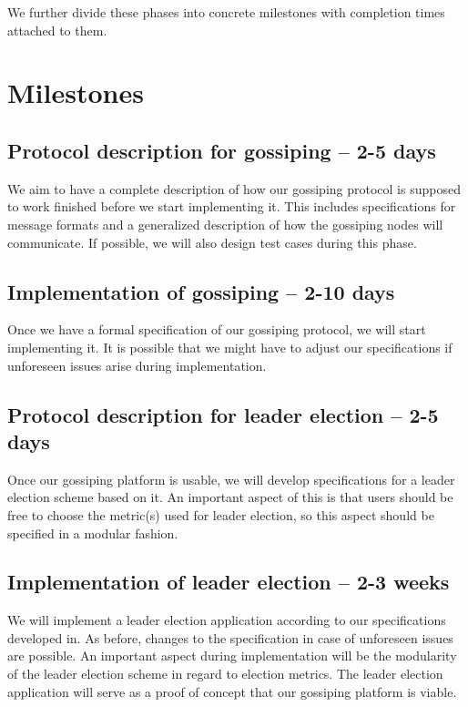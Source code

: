 \documentclass[11pt,
  a4paper,
  ngerman,
  BCOR=7mm
]{scrartcl}
\begin{document}
We further divide these phases into concrete milestones with completion
times attached to them.

\newpage

\section*{Milestones}
\label{sec:milestones}

\subsection*{Protocol description for gossiping -- 2-5 days}
\label{sub:protocol_gossiping}
 We aim to have a complete description of how our gossiping protocol is
 supposed to work finished before we start implementing it. This
 includes specifications for message formats and a generalized
 description of how the gossiping nodes will communicate. If possible,
 we will also design test cases during this phase.

\subsection*{Implementation of gossiping -- 2-10 days}
\label{sub:implementation_gossiping}
Once we have a formal specification of our gossiping protocol, we will
start implementing it. It is possible that we might have to adjust our
specifications if unforeseen issues arise during implementation.

\subsection*{Protocol description for leader election -- 2-5 days}
\label{sub:protocol_leader_election}
Once our gossiping platform is usable, we will develop specifications
for a leader election scheme based on it. An important aspect of this is
that users should be free to choose the metric(s) used for leader
election, so this aspect should be specified in a modular fashion.

\subsection*{Implementation of leader election -- 2-3 weeks}
\label{sub:implementation_leader_election}
We will implement a leader election application according to our
specifications developed in. As before, changes to the specification in
case of unforeseen issues are possible. An important aspect during
implementation will be the modularity of the leader election scheme in
regard to election metrics. The leader election application will serve
as a proof of concept that our gossiping platform is viable.
\end{document}
